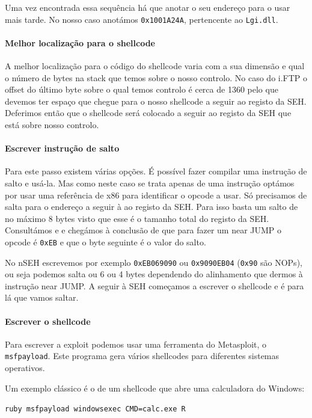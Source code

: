 \documentclass[a4paper]{article}
\begin{document}
Uma vez encontrada essa sequência há que anotar o seu endereço para o usar mais tarde. No nosso caso anotámos \texttt{0x1001A24A}, pertencente ao \texttt{Lgi.dll}.

\paragraph*{Melhor localização para o shellcode} A melhor localização para o código do shellcode varia com a sua dimensão e qual o número de bytes na stack que temos sobre o nosso controlo. No caso do i.FTP o offset do último byte sobre o qual temos controlo é cerca de 1360 pelo que devemos ter espaço que chegue para o nosso shellcode a seguir ao registo da SEH. Deferimos então que o shellcode será colocado a seguir ao registo da SEH que está sobre nosso controlo.

\paragraph*{Escrever instrução de salto} Para este passo existem várias opções. É possível fazer compilar uma instrução de salto e usá-la. Mas como neste caso se trata apenas de uma instrução optámos por usar uma referência de x86 para identificar o opcode a usar. Só precisamos de salta para o endereço a seguir à ao registo da SEH. Para isso basta um salto de no máximo 8 bytes visto que esse é o tamanho total do registo da SEH. Consultámos \cite{AMD64vol3_2013} e \cite{refx86asm} e chegámos à conclusão de que para fazer um near JUMP o opcode é \texttt{0xEB} e que o byte seguinte é o valor do salto.

No nSEH escrevemos por exemplo \texttt{0xEB069090} ou \texttt{0x9090EB04} (\texttt{0x90} são NOPs), ou seja podemos salta ou 6 ou 4 bytes dependendo do alinhamento que dermos à instrução near JUMP. A seguir à SEH começamos a escrever o shellcode e é para lá que vamos saltar.

\paragraph*{Escrever o shellcode} Para escrever a exploit podemos usar uma ferramenta do Metasploit, o \texttt{msfpayload}. Este programa gera vários shellcodes para diferentes sistemas operativos.

Um exemplo clássico é o de um shellcode que abre uma calculadora do Windows:

	\texttt{ruby msfpayload windows\/exec CMD=calc.exe R}
\end{document}

